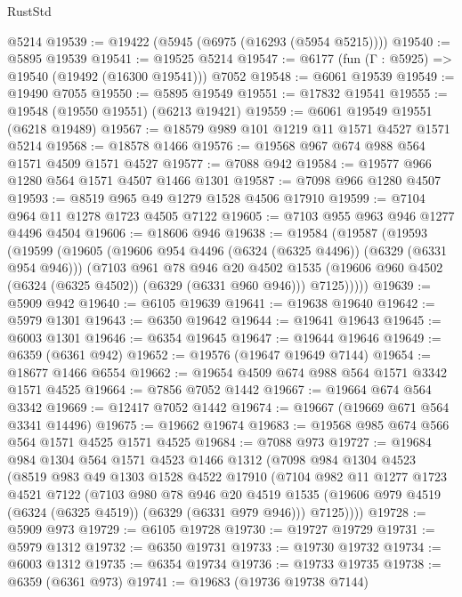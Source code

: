 \begin{lexlean}{RustStd}
\begin{coremodule}
{{    @5214
@19539 := @19422 (@5945 (@6975 (@16293 (@5954 @5215))))
@19540 := @5895 @19539
@19541 := @19525 @5214
@19547 := @6177 (fun (Γ : @5925) => @19540 (@19492 (@16300 @19541))) @7052
@19548 := @6061 @19539
@19549 := @19490 @7055
@19550 := @5895 @19549
@19551 := @17832 @19541
@19555 := @19548 (@19550 @19551) (@6213 @19421)
@19559 := @6061 @19549 @19551 (@6218 @19489)
@19567 := @18579 @989 @101 @1219 @11 @1571 @4527 @1571 @5214
@19568 := @18578 @1466
@19576 := @19568 @967 @674 @988 @564 @1571 @4509 @1571 @4527
@19577 := @7088 @942
@19584 := @19577 @966 @1280 @564 @1571 @4507 @1466 @1301
@19587 := @7098 @966 @1280 @4507
@19593 := @8519 @965 @49 @1279 @1528 @4506 @17910
@19599 := @7104 @964 @11 @1278 @1723 @4505 @7122
@19605 := @7103 @955 @963 @946 @1277 @4496 @4504
@19606 := @18606 @946
@19638 := @19584
    (@19587
      (@19593
        (@19599
          (@19605
            (@19606 @954 @4496 (@6324 (@6325 @4496)) (@6329 (@6331 @954 @946)))
            (@7103
              @961
              @78
              @946
              @20
              @4502
              @1535
              (@19606 @960 @4502 (@6324 (@6325 @4502)) (@6329 (@6331 @960 @946)))
              @7125)))))
@19639 := @5909 @942
@19640 := @6105 @19639
@19641 := @19638 @19640
@19642 := @5979 @1301
@19643 := @6350 @19642
@19644 := @19641 @19643
@19645 := @6003 @1301
@19646 := @6354 @19645
@19647 := @19644 @19646
@19649 := @6359 (@6361 @942)
@19652 := @19576 (@19647 @19649 @7144)
@19654 := @18677 @1466 @6554
@19662 := @19654 @4509 @674 @988 @564 @1571 @3342 @1571 @4525
@19664 := @7856 @7052 @1442
@19667 := @19664 @674 @564 @3342
@19669 := @12417 @7052 @1442
@19674 := @19667 (@19669 @671 @564 @3341 @14496)
@19675 := @19662 @19674
@19683 := @19568 @985 @674 @566 @564 @1571 @4525 @1571 @4525
@19684 := @7088 @973
@19727 := @19684
    @984
    @1304
    @564
    @1571
    @4523
    @1466
    @1312
    (@7098
      @984
      @1304
      @4523
      (@8519
        @983
        @49
        @1303
        @1528
        @4522
        @17910
        (@7104
          @982
          @11
          @1277
          @1723
          @4521
          @7122
          (@7103
            @980
            @78
            @946
            @20
            @4519
            @1535
            (@19606 @979 @4519 (@6324 (@6325 @4519)) (@6329 (@6331 @979 @946)))
            @7125))))
@19728 := @5909 @973
@19729 := @6105 @19728
@19730 := @19727 @19729
@19731 := @5979 @1312
@19732 := @6350 @19731
@19733 := @19730 @19732
@19734 := @6003 @1312
@19735 := @6354 @19734
@19736 := @19733 @19735
@19738 := @6359 (@6361 @973)
@19741 := @19683 (@19736 @19738 @7144)
}}
\end{coremodule}
\end{lexlean}
